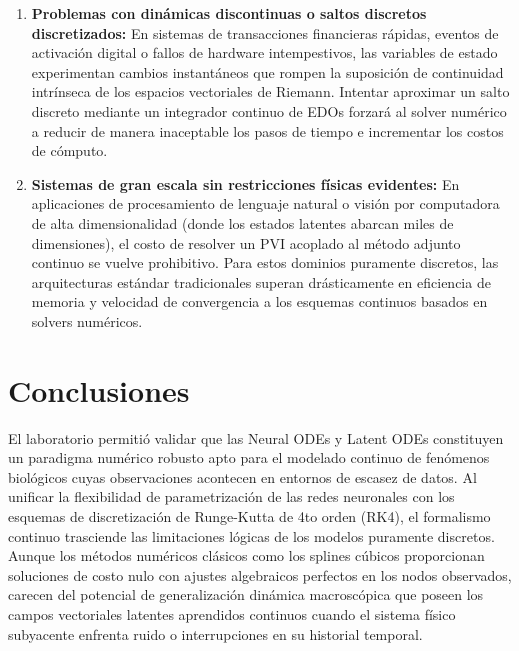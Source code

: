 \documentclass[11pt,a4paper]{article}
\begin{document}
\begin{enumerate}
    \item \textbf{Problemas con dinámicas discontinuas o saltos discretos discretizados:} En sistemas de transacciones financieras rápidas, eventos de activación digital o fallos de hardware intempestivos, las variables de estado experimentan cambios instantáneos que rompen la suposición de continuidad intrínseca de los espacios vectoriales de Riemann. Intentar aproximar un salto discreto mediante un integrador continuo de EDOs forzará al solver numérico a reducir de manera inaceptable los pasos de tiempo e incrementar los costos de cómputo.
    \item \textbf{Sistemas de gran escala sin restricciones físicas evidentes:} En aplicaciones de procesamiento de lenguaje natural o visión por computadora de alta dimensionalidad (donde los estados latentes abarcan miles de dimensiones), el costo de resolver un PVI acoplado al método adjunto continuo se vuelve prohibitivo. Para estos dominios puramente discretos, las arquitecturas estándar tradicionales superan drásticamente en eficiencia de memoria y velocidad de convergencia a los esquemas continuos basados en solvers numéricos.
\end{enumerate}

\section{Conclusiones}
El laboratorio permitió validar que las Neural ODEs y Latent ODEs constituyen un paradigma numérico robusto apto para el modelado continuo de fenómenos biológicos cuyas observaciones acontecen en entornos de escasez de datos. Al unificar la flexibilidad de parametrización de las redes neuronales con los esquemas de discretización de Runge-Kutta de 4to orden (RK4), el formalismo continuo trasciende las limitaciones lógicas de los modelos puramente discretos. Aunque los métodos numéricos clásicos como los splines cúbicos proporcionan soluciones de costo nulo con ajustes algebraicos perfectos en los nodos observados, carecen del potencial de generalización dinámica macroscópica que poseen los campos vectoriales latentes aprendidos continuos cuando el sistema físico subyacente enfrenta ruido o interrupciones en su historial temporal.
\end{document}
